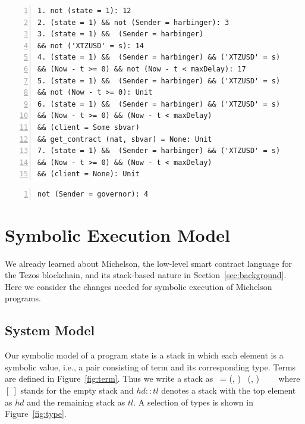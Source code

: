 \documentclass[a4paper,USenglish,cleveref, autoref,anonymous]{lipics-v2021}
\begin{document}
\begin{lstlisting}[float=tp,captionpos=b,caption={Failwith condition for the entrypoint setXtzUsdPrice\_callback},label={lst:setXtzUsdPrice_callback},numbers=left]
1. not (state = 1): 12
2. (state = 1) && not (Sender = harbinger): 3
3. (state = 1) &&  (Sender = harbinger) 
&& not ('XTZUSD' = s): 14
4. (state = 1) &&  (Sender = harbinger) && ('XTZUSD' = s)
&& (Now - t >= 0) && not (Now - t < maxDelay): 17
5. (state = 1) &&  (Sender = harbinger) && ('XTZUSD' = s)
&& not (Now - t >= 0): Unit
6. (state = 1) &&  (Sender = harbinger) && ('XTZUSD' = s)
&& (Now - t >= 0) && (Now - t < maxDelay) 
&& (client = Some sbvar) 
&& get_contract (nat, sbvar) = None: Unit
7. (state = 1) &&  (Sender = harbinger) && ('XTZUSD' = s)
&& (Now - t >= 0) && (Now - t < maxDelay) 
&& (client = None): Unit
\end{lstlisting}

\begin{lstlisting}[float=tp,captionpos=b,caption={Failwith condition for the entrypoint setMaxDataDelaySec},label={lst:setMaxDataDelaySec},numbers=left]
not (Sender = governor): 4
\end{lstlisting}
\section{Symbolic Execution Model}
\label{sec:symbolic-execution-model}

We already learned about Michelson, the low-level smart contract
language for the Tezos blockchain, and its stack-based nature in
Section~\ref{sec:background}.  Here we consider the changes needed for
symbolic execution of Michelson programs.

\subsection{System Model}
\label{sec:system-model}

Our symbolic model of a program state is a stack in which each element
is a symbolic value, i.e., a pair consisting
of term and its corresponding type. Terms are defined in
Figure~\ref{fig:term}. Thus we write a stack as \STACK\ = (\TermOne,
\TYF) \STACKCONCAT\ (\TermTwo, \TYS) \STACKCONCAT\ \DOT\ \STACKCONCAT\ 
\EMPTYSTACK\ where \ensuremath{[\ ]} stands for the empty stack and
\ensuremath{hd :: tl} denotes a stack with the top element as
\ensuremath{hd} and the remaining stack as \ensuremath{tl}. 
A selection of types is shown in Figure~\ref{fig:type}.
\end{document}
